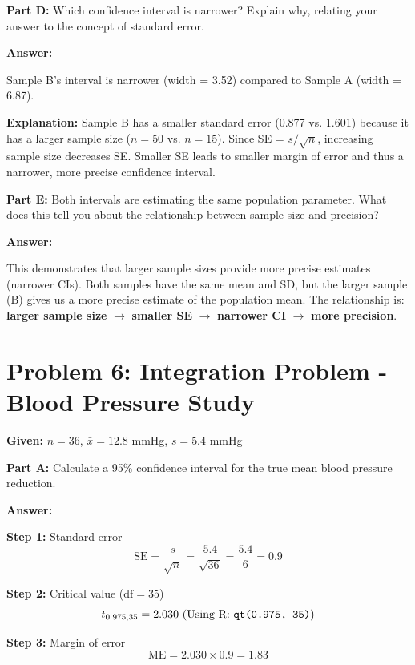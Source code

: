 \documentclass[11pt]{article}
\begin{document}
\textbf{Part D:} Which confidence interval is narrower? Explain why, relating your answer to the concept of standard error.

\textcolor{answergreen}{\textbf{Answer:}}

Sample B's interval is narrower (width = 3.52) compared to Sample A (width = 6.87).

\textbf{Explanation:} Sample B has a smaller standard error (0.877 vs. 1.601) because it has a larger sample size ($n=50$ vs. $n=15$). Since SE = $s/\sqrt{n}$, increasing sample size decreases SE. Smaller SE leads to smaller margin of error and thus a narrower, more precise confidence interval.

\vspace{6pt}

\textbf{Part E:} Both intervals are estimating the same population parameter. What does this tell you about the relationship between sample size and precision?

\textcolor{answergreen}{\textbf{Answer:}}

This demonstrates that larger sample sizes provide more precise estimates (narrower CIs). Both samples have the same mean and SD, but the larger sample (B) gives us a more precise estimate of the population mean. The relationship is: \textbf{larger sample size} $\rightarrow$ \textbf{smaller SE} $\rightarrow$ \textbf{narrower CI} $\rightarrow$ \textbf{more precision}.

\newpage

\section{Problem 6: Integration Problem - Blood Pressure Study}

\textbf{Given:} $n = 36$, $\bar{x} = 12.8$ mmHg, $s = 5.4$ mmHg

\vspace{6pt}

\textbf{Part A:} Calculate a 95\% confidence interval for the true mean blood pressure reduction.

\textcolor{answergreen}{\textbf{Answer:}}

\textbf{Step 1:} Standard error
$$\text{SE} = \frac{s}{\sqrt{n}} = \frac{5.4}{\sqrt{36}} = \frac{5.4}{6} = 0.9$$

\textbf{Step 2:} Critical value ($\text{df} = 35$)
$$t_{0.975, 35} = 2.030 \text{ (Using R: \texttt{qt(0.975, 35)})}$$

\textbf{Step 3:} Margin of error
$$\text{ME} = 2.030 \times 0.9 = 1.83$$
\end{document}
